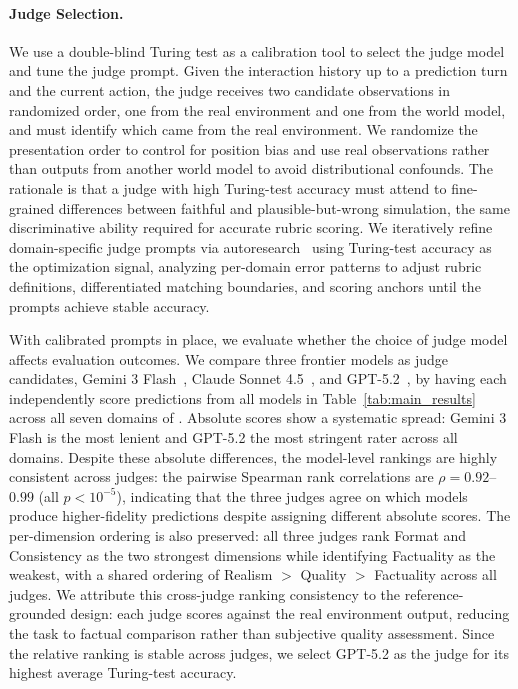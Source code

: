 \paragraph{Judge Selection.}
\label{sec:bench:judge}
We use a double-blind Turing test as a calibration tool to select the judge model and tune the judge prompt.
Given the interaction history up to a prediction turn and the current action, the judge receives two candidate observations in randomized order, one from the real environment and one from the world model, and must identify which came from the real environment.
We randomize the presentation order to control for position bias and use real observations rather than outputs from another world model to avoid distributional confounds.
The rationale is that a judge with high Turing-test accuracy must attend to fine-grained differences between faithful and plausible-but-wrong simulation, the same discriminative ability required for accurate rubric scoring.
We iteratively refine domain-specific judge prompts via autoresearch~\citep{karpathy2026autoresearch} using Turing-test accuracy as the optimization signal, analyzing per-domain error patterns to adjust rubric definitions, differentiated matching boundaries, and scoring anchors until the prompts achieve stable accuracy.

With calibrated prompts in place, we evaluate whether the choice of judge model affects evaluation outcomes.
We compare three frontier models as judge candidates, Gemini 3 Flash~\citep{gemini3flash}, Claude Sonnet 4.5~\citep{sonnet4.5}, and GPT-5.2~\citep{gpt-5.2}, by having each independently score predictions from all models in Table~\ref{tab:main_results} across all seven domains of \bench{}.
Absolute scores show a systematic spread: Gemini 3 Flash is the most lenient and GPT-5.2 the most stringent rater across all domains.
Despite these absolute differences, the model-level rankings are highly consistent across judges: the pairwise Spearman rank correlations are $\rho = 0.92$--$0.99$ (all $p < 10^{-5}$), indicating that the three judges agree on which models produce higher-fidelity predictions despite assigning different absolute scores.
The per-dimension ordering is also preserved: all three judges rank Format and Consistency as the two strongest dimensions while identifying Factuality as the weakest, with a shared ordering of Realism $>$ Quality $>$ Factuality across all judges.
We attribute this cross-judge ranking consistency to the reference-grounded design: each judge scores against the real environment output, reducing the task to factual comparison rather than subjective quality assessment.
Since the relative ranking is stable across judges, we select GPT-5.2 as the judge for its highest average Turing-test accuracy.
